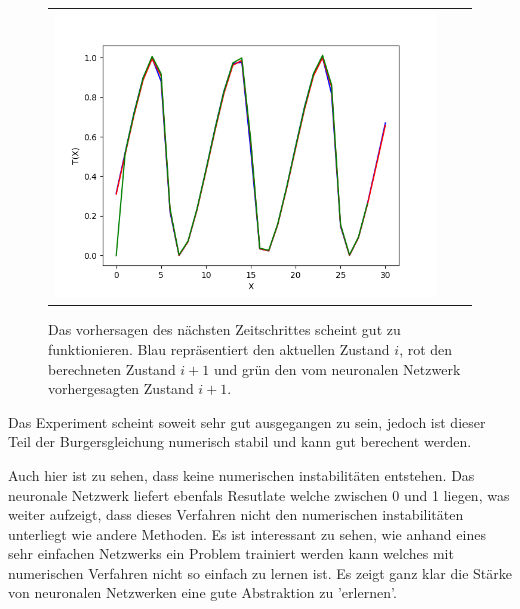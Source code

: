 \begin{figure}
\begin{tabular}{ccc}
		\includegraphics[scale=0.27]{learning/img/burger_predict20.png}
	\end{tabular}
	\label{fig:mst_burgers_predict_1}
	\caption{Das vorhersagen des nächsten Zeitschrittes scheint gut zu funktionieren. Blau repräsentiert den aktuellen Zustand $i$, rot den berechneten Zustand $i+1$ und grün den vom neuronalen Netzwerk vorhergesagten Zustand $i+1$. }
\end{figure}

Das Experiment scheint soweit sehr gut ausgegangen zu sein, jedoch ist dieser Teil der Burgersgleichung numerisch stabil und kann gut berechent werden.

Auch hier ist zu sehen, dass keine numerischen instabilitäten entstehen. Das neuronale Netzwerk liefert ebenfals Resutlate welche zwischen 0 und 1 liegen, was weiter aufzeigt, dass dieses Verfahren nicht den numerischen instabilitäten unterliegt wie andere Methoden. Es ist interessant zu sehen, wie anhand eines sehr einfachen Netzwerks ein Problem trainiert werden kann welches mit numerischen Verfahren nicht so einfach zu lernen ist. Es zeigt ganz klar die Stärke von neuronalen Netzwerken eine gute Abstraktion zu 'erlernen'.